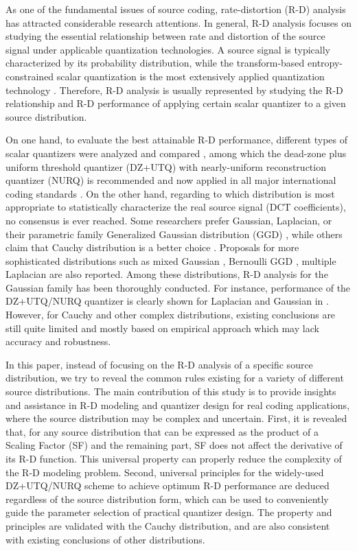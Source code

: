 \documentclass[smallabstract,smallcaptions]{dccpaper}
\begin{document}
As one of the fundamental issues of source coding, rate-distortion (R-D) analysis has attracted considerable research attentions. In general, R-D analysis focuses on studying the essential relationship between rate and distortion of the source signal under applicable quantization technologies. A source signal is typically characterized by its probability distribution, while the transform-based entropy-constrained scalar quantization is the most extensively applied quantization technology \cite{Hang_TCSVT1997}. Therefore, R-D analysis is usually represented by studying the R-D relationship and R-D performance of applying certain scalar quantizer to a given source distribution.

On one hand, to evaluate the best attainable R-D performance, different types of scalar quantizers were analyzed and compared \cite{Sullivan_TIT1996}, among which the dead-zone plus uniform threshold quantizer (DZ+UTQ) with nearly-uniform reconstruction quantizer (NURQ) is recommended and now applied in all major international coding standards \cite{Sullivan_VCIP2005}. On the other hand, regarding to which distribution is most appropriate to statistically characterize the real source signal (DCT coefficients), no consensus is ever reached. Some researchers prefer Gaussian, Laplacian, or their parametric family Generalized Gaussian distribution (GGD) \cite{Pratt_Wiley1978,Smooth_SPIE1996,Sun_TCSVT2009}, while others claim that Cauchy distribution is a better choice \cite{Kamaci_TCSVT2005}\cite{Rod_TCSVT2010}. Proposals for more sophisticated distributions such as mixed Gaussian \cite{Eude_ICASSP1994}, Bernoulli GGD \cite{Fraysse_TIT2009}, multiple Laplacian \cite{Lee_TCSVT2014} are also reported. Among these distributions, R-D analysis for the Gaussian family has been thoroughly conducted. For instance, performance of the DZ+UTQ/NURQ quantizer is clearly shown for Laplacian and Gaussian in \cite{Sullivan_VCIP2005}. However, for Cauchy and other complex distributions, existing conclusions are still quite limited and mostly based on empirical approach which may lack accuracy and robustness.

In this paper, instead of focusing on the R-D analysis of a specific source distribution, we try to reveal the common rules existing for a variety of different source distributions. The main contribution of this study is to provide insights and assistance in R-D modeling and quantizer design for real coding applications, where the source distribution may be complex and uncertain. First, it is revealed that, for any source distribution that can be expressed as the product of a Scaling Factor (SF) and the remaining part, SF does not affect the derivative of its R-D function. This universal property can properly reduce the complexity of the R-D modeling problem. Second, universal principles for the widely-used DZ+UTQ/NURQ scheme to achieve optimum R-D performance are deduced regardless of the source distribution form, which can be used to conveniently guide the parameter selection of practical quantizer design. The property and principles are validated with the Cauchy distribution, and are also consistent with existing conclusions of other distributions.
\end{document}
